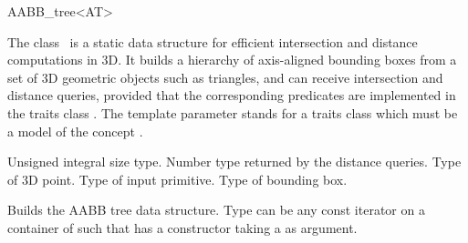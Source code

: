 \ccRefPageBegin


\begin{ccRefClass}{AABB_tree<AT>}  %


\ccDefinition
  
The class \ccRefName\ is a static data structure for efficient intersection and distance computations in 3D. It builds a hierarchy of axis-aligned bounding boxes from a set of 3D geometric objects such as triangles, and can receive intersection and distance queries, provided that the corresponding predicates are implemented in the traits class . The template parameter  stands for a traits class which must be a model of the concept .


\ccTypes

          {Unsigned integral size type.}
\ccGlue
{}
          {Number type returned by the distance queries.}
\ccGlue
{}
          {Type of 3D point.}
\ccGlue
{}
          {Type of input primitive.}
\ccGlue
{}
          {Type of bounding box.}
\ccGlue
{}
          {}


\ccCreation
{} %

{Builds the AABB tree data structure. Type  can be any const iterator on a container of  such that  has a constructor taking a  as argument.}


\end{ccRefClass}
